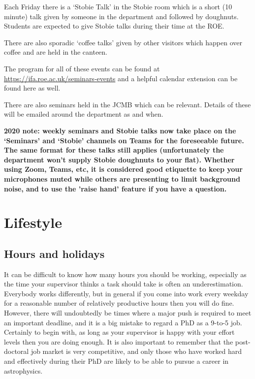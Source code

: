 Each Friday there is a `Stobie Talk' in the Stobie room which is a short (10 minute) talk given by someone in the department and followed by doughnuts. Students are expected to give Stobie talks during their time at the ROE.

There are also sporadic `coffee talks' given by other visitors which happen over coffee and are held in the canteen.

The program for all of these events can be found at \url{https://ifa.roe.ac.uk/seminars-events} and
a helpful calendar extension can be found here as well.

There are also seminars held in the JCMB which can be relevant. 
Details of these will be emailed around the department as and when.

{\bf 2020 note:  weekly seminars and Stobie talks now take place on the `Seminars' and `Stobie' channels on Teams for the foreseeable future. The same format for these talks still applies (unfortunately the department won't supply Stobie doughnuts to your flat). Whether using Zoom, Teams, etc, it is considered good etiquette to keep your microphones muted while others are presenting to limit background noise, and to use the 'raise hand' feature if you have a question.}

\section{Lifestyle}

\subsection{Hours and holidays}

It can be difficult to know how many hours you should be working,
especially as the time your supervisor thinks a task should take is
often an underestimation.  Everybody works differently, but in general if you come into work every weekday for a reasonable number of relatively productive hours then you will do fine. However, 
there will undoubtedly be times where a major push is required to meet an important deadline, and it is a big mistake to regard a PhD as a 9-to-5 job. Certainly to begin with, as long as your supervisor is happy with your effort levels then you are doing enough. It is also important to remember that the post-doctoral job market is very competitive, and only those who have worked hard and effectively during their PhD are likely to be able to pursue a career in astrophysics.

